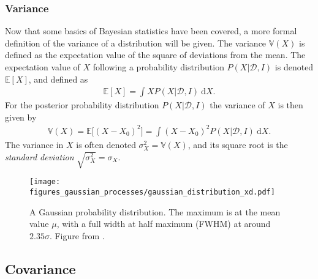 \documentclass[twoside,english]{uiofysmaster}
\begin{document}
{\subsubsection{Variance}

Now that some basics of Bayesian statistics have been covered, a more formal definition of the variance of a distribution will be given. The variance $\mathbb{V} (X)$ is defined as the expectation value of the square of deviations from the mean. The expectation value of $X$ following a probability distribution $P(X | \mathcal{D}, I)$ is denoted $\mathbb{E}[X]$, and defined as
\begin{align}
\mathbb{E}[X] = \int X P(X | \mathcal{D}, I) ~\text{d}X .
\end{align}
 For the posterior probability distribution $P(X| \mathcal{D}, I)$ the variance of $X$ is then given by \cite{sivia2006data}
\begin{align}\label{Eq:: gaussian process : variance X 1dim}
\mathbb{V}(X) = \mathbb{E} \big[ (X - X_0)^2 \big] = \int  (X - X_0)^2 P (X| \mathcal{D}, I) ~\text{d}X.
\end{align}
The variance in $X$ is often denoted $\sigma_X^2 = \mathbb{V}(X)$, and its square root is the \textit{standard deviation} $\sqrt{\sigma^2_X} = \sigma_X$. 



\begin{figure}
\centering
\texttt{[image: figures\_gaussian\_processes/gaussian\_distribution\_xd.pdf]}
\caption{A Gaussian probability distribution. The maximum is at the mean value $\mu$, with a full width at half maximum (FWHM) at around $2.35 \sigma$. Figure from \cite{sivia2006data}.}
\label{Fig:: gaussian process : Gaussian distribution}
\end{figure}

\subsection{Covariance}\label{Sec:: gaussian process : Covariance}

}
\end{document}
